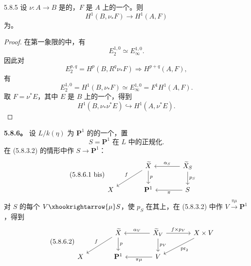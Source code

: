 \begin{SGAresult}{}{5.8.5}
设 $\nu:A\to B$ 是的，$F$ 是 $A$ 上的一个。则
\begin{equation}\tag{5.8.5.1}H^1(B,\nu_*F)\longrightarrow H^1(A,F)\end{equation}
为。
\end{SGAresult}
\begin{proof}
在第一象限的中，有
\begin{equation}\tag{5.8.5.2}E_2^{1,0}\simeq E_\infty^{1,0}.\end{equation}
因此对
\[E_2^{p,q}=H^p(B,R^q\nu_*F)\Longrightarrow H^{p+q}(A,F),\]
有
\begin{equation}\tag{5.8.5.3}E_2^{1,0}=H^1(B,\nu_*F)\simeq E_\infty^{1,0}=F^1H^1(A,F).\end{equation}
取 $F=\nu^*E$，其中 $E$ 是 $B$ 上的一个，得到
\begin{equation}\tag{5.8.5.4}H^1(B,\nu_*\nu^*E)\hookrightarrow H^1(A,\nu^*E).\end{equation}
\end{proof}
\textbf{5.8.6。} 设 $L/k(\eta)$ 为 $\mathbf P^1$ 的的一个，置
\begin{equation}\tag{5.8.6.1}S=\text{$\mathbf P^1$ 在 $L$ 中的正规化}.\end{equation}
在 (5.8.3.2) 的情形中作 $S\to\mathbf P^1$：
\begin{equation}\tag{5.8.6.1 bis}
\begin{tikzcd}[column sep=large]
&\widetilde X\arrow[dl,"f"']\arrow[d,"p"]&\widetilde X_S\arrow[l,"\alpha_S"']\arrow[d,"p_S"]\\
X&\mathbf P^1&S\arrow[l,"\pi"]
\end{tikzcd}
\end{equation}
对 $S$ 的每个 $V\xhookrightarrow{\mu}S$，使 $p_S$ 在其上，在 (5.8.3.2) 中作 $V\xrightarrow{\pi\mu}\mathbf P^1$，得到
\begin{equation}\tag{5.8.6.2}
\begin{tikzcd}[column sep=large]
&\widetilde X\arrow[dl,"f"']\arrow[d,"p"]&\widetilde X_V\arrow[l,"\alpha_V"']\arrow[d,"p_V"]\arrow[r,"f\times p_V"]&X\times V\arrow[dl,"\operatorname{pr}_2"]\\
X&\mathbf P^1&V\arrow[l,"\pi\mu"]&
\end{tikzcd}
\end{equation}

